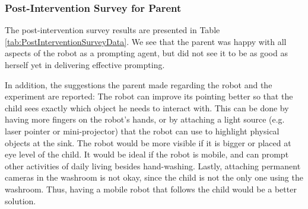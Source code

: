 \subsubsection{Post-Intervention Survey for Parent}
The post-intervention survey results are presented in Table \ref{tab:PostInterventionSurveyData}.  We see that the parent was happy with all aspects of the robot as a prompting agent, but did not see it to be as good as herself yet in delivering effective prompting.

In addition, the suggestions the parent made regarding the robot and the experiment are reported:  The robot can improve its pointing better so that the child sees exactly which object he needs to interact with.  This can be done by having more fingers on the robot's hands, or by attaching a light source (e.g. laser pointer or mini-projector) that the robot can use to highlight physical objects at the sink.  The robot would be more visible if it is bigger or placed at eye level of the child.  It would be ideal if the robot is mobile, and can prompt other activities of daily living besides hand-washing.  Lastly, attaching permanent cameras in the washroom is not okay, since the child is not the only one using the washroom.  Thus, having a mobile robot that follows the child would be a better solution.



